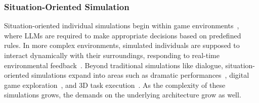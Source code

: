 \subsubsection{Situation-Oriented Simulation}
Situation-oriented individual simulations begin within game environments~\cite{light2023avalonbenchevaluatingllmsplaying}, where LLMs are required to make appropriate decisions based on predefined rules. In more complex environments, simulated individuals are supposed to interact dynamically with their surroundings, responding to real-time environmental feedback~\cite{chen2024socialbenchsocialityevaluationroleplaying,qiu2024interactiveagentssimulatingcounselorclient}. Beyond traditional simulations like dialogue, situation-oriented simulations expand into areas such as dramatic performances~\cite{wu2024roleplaydramainteractionllmsolution}, digital game exploration~\cite{wang2023voyageropenendedembodiedagent}, and 3D task execution~\cite{huang2024embodiedgeneralistagent3d}. As the complexity of these simulations grows, the demands on the underlying architecture grow as well.



